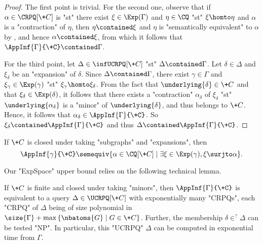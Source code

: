 \begin{proof}
	The first point is trivial. For the second one, observe that
	if $\alpha \in \CRPQ[\+C]$ is "st" there exist $\xi \in \Exp(\Gamma)$ and
	$\eta \in \CQ$ "st" $\xi \homto \eta$ and $\alpha$ is a "contraction" of $\eta$,
	then $\eta \contained \xi$ and $\eta$ is "semantically equivalent" to $\alpha$ by , and hence $\alpha \contained \xi$, from which it follows that $\AppInf{\Gamma}{\+C} \contained \Gamma$.

	For the third point, let $\Delta \in \infUCRPQ[\+C]$ "st" $\Delta \contained \Gamma$. Let $\delta \in \Delta$ and $\xi_{\delta}$ be an "expansion" of $\delta$. Since $\Delta \contained \Gamma$, there exist $\gamma \in \Gamma$ and $\xi_{\gamma} \in \Exp(\gamma)$ "st" $\xi_{\gamma} \homto \xi_{\delta}$. From the fact that $\underlying{\delta} \in \+C$ and that $\xi_{\delta} \in \Exp(\delta)$, it follows that there exists a "contraction" $\alpha_{\delta}$ of $\xi_{\delta}$ "st" $\underlying{\alpha_{\delta}}$ is a "minor" of $\underlying{\delta}$, and thus belongs to $\+C$.
	Hence, it follows that $\alpha_{\delta} \in \AppInf{\Gamma}{\+C}$.
	So $\xi_{\delta} \contained \AppInf{\Gamma}{\+C}$ and thus
	$\Delta \contained \AppInf{\Gamma}{\+C}$.
\end{proof}

\begin{remark}
	If $\+C$ is closed under taking "subgraphs" and "expansions", then
	\[\AppInf{\gamma}{\+C} \semequiv \{
		\alpha \in \CQ[\+C] \mid \exists \xi \in \Exp(\gamma), 
		\xi \surjto \alpha
	\}.\]
\end{remark}

Our "ExpSpace" upper bound relies on the following technical lemma.

\begin{lemma}
	\AP\label{lemma:approximation-for-finclass}
	If $\+C$ is finite and closed under taking "minors", then $\AppInf{\Gamma}{\+C}$ is equivalent to a query $\Delta\in \UCRPQ[\+C]$ with exponentially many "CRPQs", each "CRPQ" of $\Delta$ being of size polynomial in $\size{\Gamma} + \max{\set{\nbatoms{G} \mid G \in \+C}}$.
	Further, the membership $\delta \in^? \Delta$ can be tested "NP". 
	In particular, this "UCRPQ" $\Delta$ can be computed in exponential time from $\Gamma$.
\end{lemma}

